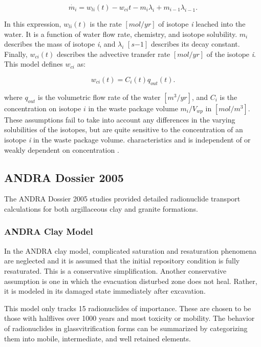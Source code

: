{\begin{equation}
\dot{m_i}=w_{li}(t)-w_{ci}{t}-m_i\lambda_i+m_{i-1}\lambda_{i-1}.\nonumber
\end{equation}

In this expression, $w_{li}(t)$ is the rate $[mol/yr]$ of isotope \emph{i}
leached into the water.  It is a function of water flow rate, chemistry, and
isotope solubility. $m_i$ describes the mass of isotope \emph{i}, and
$\lambda_i$ $[s{-1}]$ describes its decay constant. Finally, $w_{ci}(t)$
describes the advective transfer rate $[mol/yr]$ of the isotope \emph{i}. This 
model defines $w_{ci}$ as:

\begin{equation}
  w_{ci}(t)=C_i(t)q_{out}(t). 
\end{equation}

where $q_{out}$ is the volumetric flow rate of the water $[m^3/yr]$, and 
$C_i$ is the concentration on isotope $i$ in the waste package volume 
$m_i/V_{wp}$ in $[mol/m^3]$. These assumptions fail to take into account any
differences in the varying solubilities of the isotopes, but are quite
sensitive to the concentration of an isotope \emph{i} in the waste package
volume.  
characteristics and is independent of or weakly dependent on concentration 
\cite{li_methodology_2006}.

\subsection{ANDRA Dossier 2005} The ANDRA Dossier 2005 studies provided
detailed radionuclide transport calculations for both argillaceous clay and granite
formations. 

\subsubsection{ANDRA Clay Model} 

In the \gls{ANDRA} clay model, complicated saturation and resaturation phenomena 
are neglected and it is assumed that the initial repository condition is fully
resaturated. This is a conservative simplification. Another conservative
assumption is one in which the evacuation disturbed zone does not heal. Rather,
it is modeled in its damaged state immediately after excavation. 

This model only tracks 15 radionuclides of importance.  These are chosen to be those
with halflives over 1000 years and most toxicity or mobility.
\cite{andra_argile:_2005} The behavior of radionuclides in 
glassvitrification forms can be summarized by categorizing them into mobile,
intermediate, and well retained elements. 

}
